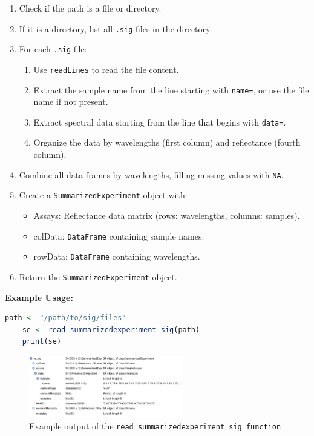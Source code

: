 \documentclass[12pt,a4paper]{report}
\begin{document}
\begin{enumerate}
    \item Check if the path is a file or directory.
    \item If it is a directory, list all \texttt{.sig} files in the directory.
    \item For each \texttt{.sig} file:
    \begin{enumerate}
        \item Use \texttt{readLines} to read the file content.
        \item Extract the sample name from the line starting with \texttt{name=}, or use the file name if not present.
        \item Extract spectral data starting from the line that begins with \texttt{data=}.
        \item Organize the data by wavelengths (first column) and reflectance (fourth column).
    \end{enumerate}
    \item Combine all data frames by wavelengths, filling missing values with \texttt{NA}.
    \item Create a \texttt{SummarizedExperiment} object with:
    \begin{itemize}
        \item Assays: Reflectance data matrix (rows: wavelengths, columns: samples).
        \item colData: \texttt{DataFrame} containing sample names.
        \item rowData: \texttt{DataFrame} containing wavelengths.
    \end{itemize}
    \item Return the \texttt{SummarizedExperiment} object.
\end{enumerate}

\textbf{Example Usage:}

\begin{lstlisting}[language=R, style=mystyle]
    path <- "/path/to/sig/files"
    se <- read_summarizedexperiment_sig(path)
    print(se)
\end{lstlisting}

\begin{figure}[h]
    \centering
    \includegraphics[width=0.6\textwidth]{Figures/se_sig.png}
    \caption{Example output of the \texttt{read\_summarizedexperiment\_sig function}}
    \label{Figure 2}
\end{figure}
\end{document}
